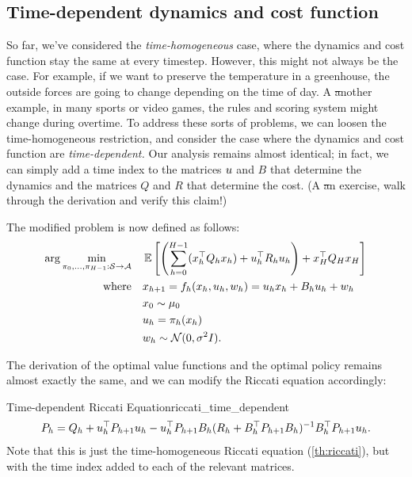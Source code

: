 \documentclass[../main/main]{subfiles}
\begin{document}
\subsection[Time-dependency]{Time-dependent dynamics and cost function} \label{sec:time_dep_lqr}

So far, we've considered the \emph{time-homogeneous} case, where the dynamics and cost function stay the same at every timestep. However, this might not always be the case. For example, if we want to preserve the temperature in a greenhouse, the outside forces are going to change depending on the time of day.
A \st another example, in many sports or video games, the rules and scoring system might change during overtime.
To address these sorts of problems, we can loosen the time-homogeneous restriction, and consider the case where the dynamics and cost function are \emph{time-dependent.}
Our analysis remains almost identical; in fact, we can simply add a time index to the matrices $u$ and $B$ that determine the dynamics and the matrices $Q$ and $R$ that determine the cost. (A \st an exercise, walk through the derivation and verify this claim!)

The modified problem is now defined as follows:
\begin{align*}
    \arg \min_{\pi_{0}, \dots, \pi_{H-1} : \mathcal{S} \to \mathcal{A}} \quad & \operatorname*{\mathbb{E}} \left[ \left( \sum_{h=0}^{H-1} (x_h^\top Q_h x_h) + u_h^\top R_h u_h \right) + x_H^\top Q_H x_H \right] \\
    \textrm{where} \quad & x_{h+1} = f_h(x_h, u_h, w_h) = u_h x_h + B_h u_h + w_h \\
    & x_0 \sim \mu_0 \\
    & u_h = \pi_h (x_h) \\
    & w_h \sim \mathcal{N}(0, \sigma^2 I).
\end{align*}

The derivation of the optimal value functions and the optimal policy remains almost exactly the same,
and we can modify the Riccati equation accordingly:

\begin{definition}{Time-dependent Riccati Equation}{riccati_time_dependent}
    \[
        P_h = Q_h + u_h^\top P_{h+1} u_h - u_h^\top P_{h+1} B_h (R_h + B_h^\top P_{h+1} B_h)^{-1} B_h^\top P_{h+1} u_h.
    \]
    Note that this is just the time-homogeneous Riccati equation (\autoref{th:riccati}), but with the
    time index added to each of the relevant matrices.
\end{definition}
\end{document}
